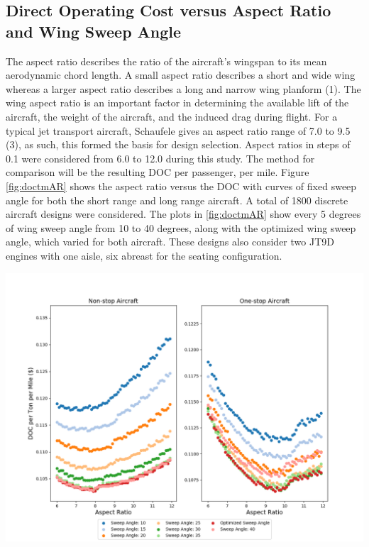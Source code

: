 \documentclass{article}
\begin{document}
    \subsection{Direct Operating Cost versus Aspect Ratio and Wing Sweep Angle}
    \label{sec:AR}
        \begin{flushleft}
            The aspect ratio describes the ratio of the aircraft's wingspan to
            its mean aerodynamic chord length. A small aspect ratio describes a
            short and wide wing whereas a larger aspect ratio describes a long
            and narrow wing planform (1). The wing aspect ratio is an important
            factor in determining the available lift of the aircraft, the weight
            of the aircraft, and the induced drag during flight. For a typical
            jet transport aircraft, Schaufele gives an aspect ratio range of 7.0
            to 9.5 (3), as such, this formed the basis for design selection.
            Aspect ratios in steps of 0.1 were considered from 6.0 to 12.0
            during this study. The method for comparison will be the resulting
            DOC per passenger, per mile. Figure \ref{fig:doctmAR} shows the
            aspect ratio versus the DOC with curves of fixed sweep angle for
            both the short range and long range aircraft. A total of 1800
            discrete aircraft designs were considered. The plots in
            \ref{fig:doctmAR} show every 5 degrees of wing sweep angle from 10
            to 40 degrees, along with the optimized wing sweep angle, which
            varied for both aircraft. These designs also consider two JT9D
            engines with one aisle, six abreast for the seating configuration.
        \end{flushleft}

        \begin{center}
            \includegraphics[scale=0.50]{DOCTM v Sweep Angle.PNG}
            \label{fig:doctmAR}%
        \end{center}
\end{document}
